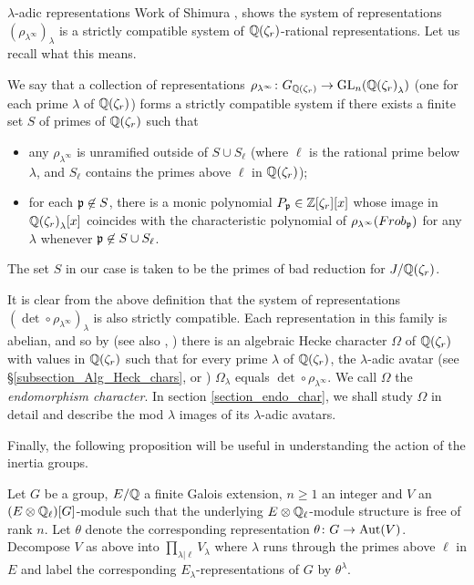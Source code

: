 \documentclass[11pt,a4paper]{article}
\newcommand{\Qr}{{\QQ(\zeta_r)}}
\newcommand{\Zr}{{\ZZ[\zeta_r]}}
\newcommand{\GQr}{G_{\QQ(\zeta_{r})}}
\begin{document}
\begin{section}{$\lambda$-adic representations}
Work of Shimura \cite[\S 11.10]{shimura_ANF}, \cite[Thm 2.1.2]{ribet_RM} shows the system of representations $(\rho_{\lambda^\infty})_\lambda$ is a strictly compatible system of $\Qr$-rational representations. Let us recall what this means.
\begin{definition}
We say that a collection of representations $\rho_{\lambda^\infty}\colon \GQr \rightarrow \GL_n(\Qr_\lambda)$ (one for each prime $\lambda$ of $\Qr$) forms a strictly compatible system if there exists a finite set $S$ of primes of $\Qr$ such that
\begin{itemize}
    \item  any $\rho_{\lambda^\infty}$ is unramified outside of $S\cup S_\ell$ (where $\ell$ is the rational prime below $\lambda$, and $S_\ell$ contains the primes above $\ell$ in $\Qr$);
    \item for each $\mathfrak{p} \not \in S$, there is a monic polynomial $P_\p \in \Zr[x]$ whose image in $\Qr_\lambda[x]$ coincides with the characteristic polynomial of $\rho_{\lambda^\infty}(\Frob_\p)$ for any $\lambda$ whenever $\mathfrak{p} \not \in S \cup S_\ell$.
\end{itemize}
\end{definition}
The set $S$ in our case is taken to be the primes of bad reduction for $J/\Qr$.

It is clear from the above definition that the system of  representations $(\det \circ \rho_{\lambda^\infty})_\lambda$ is also strictly compatible.
Each representation in this family is abelian, and so by \cite[\S 1.1, Prop 1.4]{Periods_of_Hecke_characters} (see also \cite[Thm 2.13]{ribet_RM}, \cite[Main Thm]{Henniart}) there is an algebraic Hecke character $\Omega$ of $\Qr$ with values in $\Qr$ such that for every prime $\lambda$ of $\Qr$,  the $\lambda$-adic avatar (see \S\ref{subsection_Alg_Heck_chars}, or \cite[\S0.5]{Periods_of_Hecke_characters}) $\Omega_\lambda $ equals $ \det \circ\rho_{\lambda^\infty}$. We call $\Omega$ the \emph{endomorphism character}. In section \ref{section_endo_char}, we shall study $\Omega$ in detail and describe the mod $\lambda$ images of its $\lambda$-adic avatars.


Finally, the following proposition will be useful in understanding the action of the inertia groups.

\begin{proposition}
\label{prop:rationality_andlambda_adicreps}
    Let $G$ be a group,  $E/\mathbb{Q}$ a finite Galois extension, $n \geq 1$ an integer and $V$ an  $(E\otimes \mathbb{Q}_\ell)[G]$-module such that the underlying $E\otimes \mathbb{Q}_\ell$-module structure is free of rank $n$.
    Let $\theta$ denote the corresponding representation $\theta \colon G \rightarrow \Aut(V)$.
    Decompose $V$ as above into $\prod_{\lambda |\ell} V_\lambda$ where $\lambda$ runs through the primes above $\ell$ in $E$ and label the corresponding $E_\lambda$-representations of $G$ by $\theta^\lambda$.


\end{proposition}
\end{section}
\end{document}
